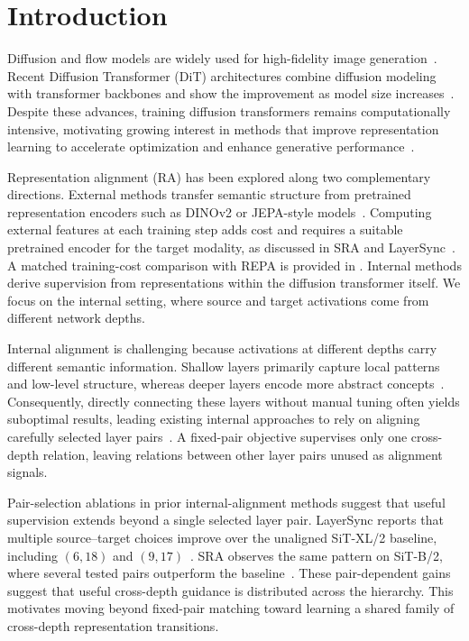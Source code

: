\section{Introduction}
\label{sec:introduction}

Diffusion and flow models are widely used for high-fidelity image generation~\citep{ho2020ddpm,dhariwal2021diffusion,lipman2022flow}. Recent Diffusion Transformer (DiT) architectures combine diffusion modeling with transformer backbones and show the improvement as model size increases~\citep{peebles2023scalable,ma2024sit}. Despite these advances, training diffusion transformers remains computationally intensive, motivating growing interest in methods that improve representation learning to accelerate optimization and enhance generative performance~\citep{yu2024repa,jiang2025sra,haghighi2026layersync,wang2025dispersive}.

Representation alignment (RA) has been explored along two complementary directions. External methods transfer semantic structure from pretrained representation encoders such as DINOv2 or JEPA-style models~\citep{yu2024repa,oquab2023dinov2,assran2023ijepa}. Computing external features at each training step adds cost and requires a suitable pretrained encoder for the target modality, as discussed in SRA and LayerSync~\citep{jiang2025sra,haghighi2026layersync}. A matched training-cost comparison with REPA is provided in . Internal methods derive supervision from representations within the diffusion transformer itself. We focus on the internal setting, where source and target activations come from different network depths.

Internal alignment is challenging because activations at different depths carry different semantic information. Shallow layers primarily capture local patterns and low-level structure, whereas deeper layers encode more abstract concepts~\citep{xiang2023denoising,mukhopadhyay2024,kim2025,stracke2025}. Consequently, directly connecting these layers without manual tuning often yields suboptimal results, leading existing internal approaches to rely on aligning carefully selected layer pairs~\citep{jiang2025sra,haghighi2026layersync}. A fixed-pair objective supervises only one cross-depth relation, leaving relations between other layer pairs unused as alignment signals.
 
Pair-selection ablations in prior internal-alignment methods suggest that useful supervision extends beyond a single selected layer pair. LayerSync reports that multiple source--target choices improve over the unaligned SiT-XL/2 baseline, including $(6,18)$ and $(9,17)$~\citep{haghighi2026layersync}. SRA observes the same pattern on SiT-B/2, where several tested pairs outperform the baseline~\citep{jiang2025sra}. These pair-dependent gains suggest that useful cross-depth guidance is distributed across the hierarchy. This motivates moving beyond fixed-pair matching toward learning a shared family of cross-depth representation transitions.

